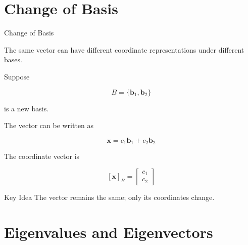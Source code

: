 \documentclass[aspectratio=169]{beamer}
\begin{document}
\section{Change of Basis}

\begin{frame}{Change of Basis}
\small

The same vector can have different coordinate representations under different bases.

Suppose

$$
B=\{\mathbf{b}_1,\mathbf{b}_2\}
$$

is a new basis.

The vector can be written as

$$
\mathbf{x}
=
c_1\mathbf{b}_1+c_2\mathbf{b}_2
$$

The coordinate vector is

$$
[\mathbf{x}]_B=
\begin{bmatrix}
c_1\\
c_2
\end{bmatrix}
$$

\begin{block}{Key Idea}
The vector remains the same; only its coordinates change.
\end{block}

\end{frame}

\section{Eigenvalues and Eigenvectors}
\end{document}
